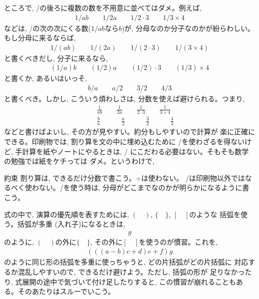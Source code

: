 ところで, /の後ろに複数の数を不用意に並べてはダメ。例えば,  
\begin{eqnarray*}
1/ab\quad\quad
1/2a\quad\quad
1/2\cdot3\quad\quad
1/3\times4
\end{eqnarray*}
などは, /の次の次にくる数($1/ab$なら$b$)が, 
分母なのか分子なのかが紛らわしい。もし分母に来るならば, 
\begin{eqnarray*}
1/(ab)\quad\quad
1/(2a)\quad\quad
1/(2\cdot3)\quad\quad
1/(3\times4)
\end{eqnarray*}
と書くべきだし, 分子に来るなら, 
\begin{eqnarray*}
(1/a)b\quad\quad
(1/2)a\quad\quad
(1/2)\cdot3\quad\quad
(1/3)\times4
\end{eqnarray*}
と書くか, あるいはいっそ, 
\begin{eqnarray*}
b/a\quad\quad
a/2\quad\quad
3/2\quad\quad
4/3
\end{eqnarray*}
と書くべき。しかし, こういう煩わしさは, 分数を使えば避けられる。つまり, 
\begin{eqnarray*}
&&\frac{1}{ab}\quad\quad
\frac{1}{2a}\quad\quad
\frac{1}{2\cdot3}\quad\quad
\frac{1}{3\times4}\\
&&\frac{b}{a}\quad\quad\quad
\frac{a}{2}\quad\quad\quad
\frac{3}{2}\quad\quad\quad
\frac{4}{3}
\end{eqnarray*}
などと書けばよいし, その方が見やすい。約分もしやすいので計算が
楽に正確にできる。印刷物では, 割り算を文の中に埋め込むために
/を使わざるを得ないけど, 手計算を紙やノートにやるときは, /
にこだわる必要はない。そもそも数学の勉強では紙をケチっては
ダメ。というわけで, 
\begin{itembox}{約束}
割り算は, できるだけ分数で書こう。$\div$は使わない。
$/$は印刷物以外ではなるべく使わない。/を使う時は, 
分母がどこまでなのかが明らかになるように書こう。
\end{itembox}

式の中で, 演算の優先順を表すためには, $(\quad)$, $\{\quad\}$, $[\quad]$のような
括弧を使う。括弧が多重 (入れ子)になるときは, 
\begin{eqnarray}
[\{(a-b)c+d\}e+f]g
\end{eqnarray}
のように, 
$(\quad)$の外に$\{\quad\}$, その外に$[\quad]$を使うのが慣習。これを, 
\begin{eqnarray}
(((a-b)c+d)e+f)g
\end{eqnarray}
のように同じ形の括弧を多重に使っちゃうと, どの片括弧がどの片括弧に
対応するか混乱しやすいので, できるだけ避けよう。ただし, 括弧の形が
足りなかったり, 式展開の途中で気づいて付け足したりすると, 
この慣習が崩れることもある。そのあたりはスルーでいこう。


